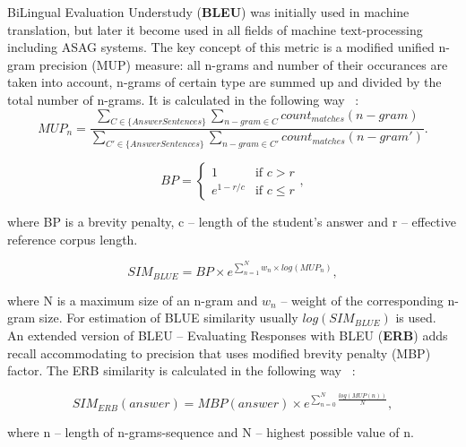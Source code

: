 BiLingual Evaluation Understudy (\textbf{BLEU}) was initially used in machine translation, but later it become used in all fields of machine text-processing including ASAG systems. The key concept of this metric is a modified unified n-gram precision (MUP) measure: all n-grams and number of their occurances are taken into account, n-grams of certain type are summed up and divided by the total number of n-grams. It is calculated in the following way ~\cite{BLEU}:\\

\begin{equation} \label{eq:MUP}
MUP_n = \frac{\sum\limits_{C \in \{AnswerSentences\}} \sum\limits_{n-gram \in C} count_{matches}(n-gram)}{\sum\limits_{C' \in \{AnswerSentences\}} \sum\limits_{n-gram \in C'} count_{matches}(n-gram')}.
\end{equation}

\begin{equation} \label{eq:BP}
BP = \begin{cases}
   1 &\text{if $c>r$}\\
   e^{1-r/c} &\text{if $c \leq r$}
 \end{cases},
\end{equation}

where BP is a brevity penalty, c -- length of the student's answer and r -- effective reference corpus length.

\begin{equation} \label{eq:BLUE}
SIM_{BLUE} = BP \times e^{\sum^N_{n=1}w_n \times log(MUP_n)},
\end{equation}

where N is a maximum size of an n-gram and $w_n$ -- weight of the corresponding n-gram size. For estimation of BLUE similarity usually $log(SIM_{BLUE})$ is used. \\

An extended version of BLEU -- Evaluating Responses with BLEU (\textbf{ERB}) adds recall accommodating to precision that uses modified brevity penalty (MBP) factor. The ERB similarity is calculated in the following way ~\cite{ERB}:

\begin{equation} \label{eq:ERB}
SIM_{ERB}(answer) = MBP(answer)\times e^{\sum^{N}_{n=0}\frac{log(MUP(n))}{N}},
\end{equation}

where n -- length of n-grams-sequence and N -- highest possible value of n. \\

